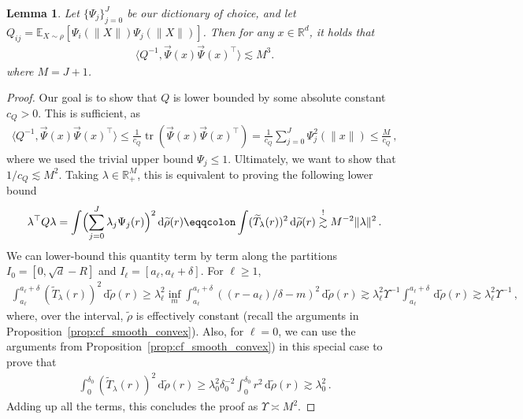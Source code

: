 \documentclass[twoside]{article}
\newcommand{\1}{\mathds{1}}
\newcommand{\R}{\mathbb{R}}
\newcommand*{\E}{\mathbb E}
\DeclareMathOperator{\tr}{tr}
\newcommand*{\rd}{\mathrm{d}}
\newcommand*{\dd}{\, \rd}
\theoremstyle{plain}
\newtheorem{lemma}[theorem]{Lemma}
\theoremstyle{definition}
\theoremstyle{remark}
\renewcommand{\tilde}{\widetilde}
\begin{document}
\begin{lemma}\label{lem:sgd_lemma2}
Let $\{\Psi_j\}_{j=0}^J$ be our dictionary of choice, and let $Q_{ij} = \E_{X\sim\rho}[\Psi_i(\|X\|)\Psi_j(\|X\|)]$. Then for any $x \in \R^d$, it holds that
\begin{align*}
    \langle Q^{-1}, \vec\Psi(x)\vec\Psi(x)^\top\rangle \lesssim M^3.
\end{align*}
where $M = J+1$.
\end{lemma}
\begin{proof}
Our goal is to show that ${Q}$ is lower bounded by some absolute constant $c_Q > 0$. This is sufficient, as
\begin{align*}
    \langle Q^{-1}, \vec\Psi(x)\vec\Psi(x)^\top \rangle  {\le} \frac{1}{c_Q}\tr(\vec\Psi(x)\vec\Psi(x)^\top) = \frac{1}{c_Q}\sum_{j=0}^J\Psi_j^2(\|x\|) \leq \frac{M}{c_Q}\,,
\end{align*}
where we used the trivial upper bound $\Psi_j \leq 1$. Ultimately, we want to show that $1/c_Q \lesssim M^2$. Taking $\lambda \in \R^M_+$, this is equivalent to proving the following lower bound
\begin{align*}
    \lambda^\top Q \lambda = \int \Bigl(\sum_{j=0}^J \lambda_j\Psi_j(r)\Bigr)^2 \dd \tilde\rho(r) \eqqcolon \int (\tilde T_\lambda(r))^2 \dd \tilde\rho(r) \overset{!}{\gtrsim} M^{-2}\|\lambda\|^2\,.
\end{align*}
We can lower-bound this quantity term by term along the partitions $I_0 = [0,\sqrt{d}-R]$ and $I_\ell = [a_\ell,a_\ell + \delta]$. For $\ell \geq 1$,
\begin{align*}
    \int_{a_\ell}^{a_\ell + \delta} (\tilde T_\lambda(r))^2 \dd \tilde\rho(r) \geq \lambda_\ell^2 \inf_m \int_{a_\ell}^{a_\ell + \delta} ((r - a_\ell)/\delta - m)^2 \dd \tilde\rho(r) \gtrsim \lambda_\ell^2 \Upsilon^{-1}\int_{a_\ell}^{a_\ell + \delta}\dd\tilde\rho(r)\gtrsim \lambda_\ell^2 \Upsilon^{-1}\,,
\end{align*}
where, over the interval, $\tilde\rho$ is effectively constant (recall the arguments in Proposition~\ref{prop:cf_smooth_convex}). Also, for $\ell=0$, we can use the arguments from Proposition~\ref{prop:cf_smooth_convex}) in this special case to prove that
\begin{align*}
    \int_{0}^{\delta_0} (\tilde T_\lambda(r))^2 \dd \tilde\rho(r) \geq \lambda_0^2 \delta_0^{-2} \int_0^{\delta_0} r^2 \dd \tilde\rho(r) \gtrsim \lambda_0^2 \,.
\end{align*}
Adding up all the terms, this concludes the proof as $\Upsilon \asymp M^2$.
\end{proof}
\end{document}
